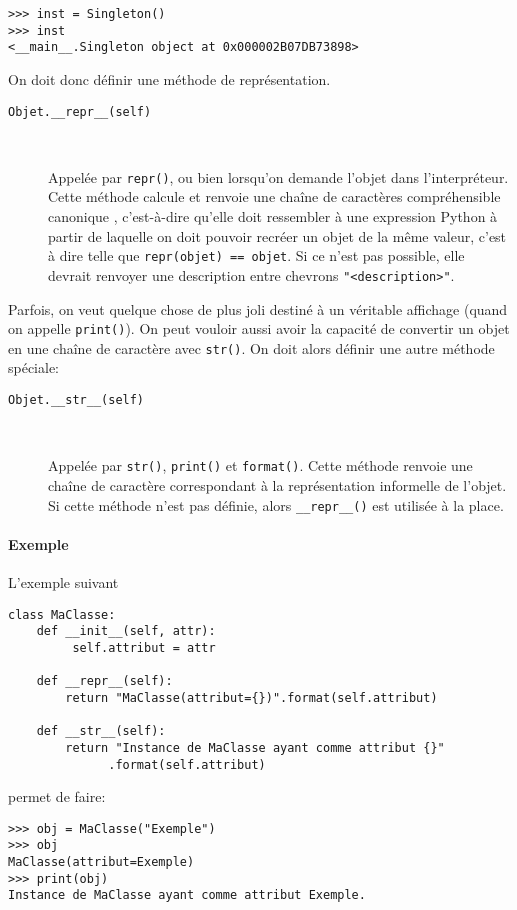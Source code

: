 \begin{verbatim}
>>> inst = Singleton()
>>> inst
<__main__.Singleton object at 0x000002B07DB73898>
\end{verbatim}

On doit donc définir une méthode de représentation.

\begin{description}
    \item[\texttt{Objet.__repr__(self)}]~

    Appelée par \texttt{repr()}, ou bien lorsqu'on demande l'objet dans l'interpréteur. Cette méthode calcule et renvoie une chaîne de caractères compréhensible \og canonique \fg{}, c'est-à-dire qu'elle doit ressembler à une expression Python à partir de laquelle on doit pouvoir recréer un objet de la même valeur, c'est à dire telle que \texttt{repr(objet) == objet}. Si ce n'est pas possible, elle devrait renvoyer une description entre chevrons \texttt{"<description>"}. 
\end{description}

Parfois, on veut quelque chose de plus joli destiné à un véritable affichage (quand on appelle \texttt{print()}). On peut vouloir aussi avoir la capacité de convertir un objet en une chaîne de caractère avec \texttt{str()}. On doit alors définir une autre méthode spéciale:

\begin{description}
    \item[\texttt{Objet.__str__(self)}]~

    Appelée par \texttt{str()}, \texttt{print()} et \texttt{format()}. Cette méthode renvoie une chaîne de caractère correspondant à la représentation informelle de l'objet. Si cette méthode n'est pas définie, alors \texttt{__repr__()} est utilisée à la place.
\end{description}
\paragraph{Exemple} L'exemple suivant
\begin{verbatim}
class MaClasse:
    def __init__(self, attr):
         self.attribut = attr

    def __repr__(self):
        return "MaClasse(attribut={})".format(self.attribut)

    def __str__(self):
        return "Instance de MaClasse ayant comme attribut {}"
              .format(self.attribut)
\end{verbatim}
permet de faire:
\begin{verbatim}
>>> obj = MaClasse("Exemple")
>>> obj
MaClasse(attribut=Exemple)
>>> print(obj)
Instance de MaClasse ayant comme attribut Exemple.
\end{verbatim}

